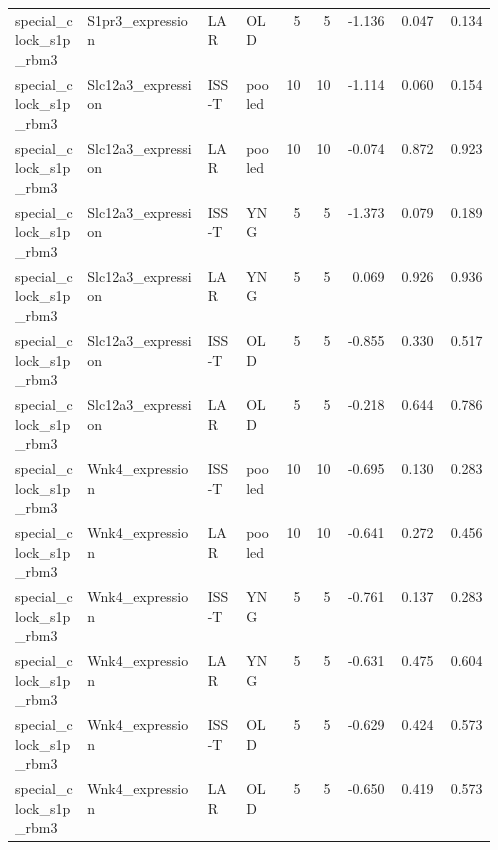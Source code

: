 \documentclass[11pt]{article}
\begin{document}
\begin{landscape}
\begin{longtable}{p{0.15\linewidth}p{0.25\linewidth}p{0.08\linewidth}p{0.08\linewidth}rrrrr}
special\_clock\_s1p\_rbm3 & S1pr3\_expression & LAR & OLD & 5 & 5 & -1.136 & 0.047 & 0.134 \\
special\_clock\_s1p\_rbm3 & Slc12a3\_expression & ISS-T & pooled & 10 & 10 & -1.114 & 0.060 & 0.154 \\
special\_clock\_s1p\_rbm3 & Slc12a3\_expression & LAR & pooled & 10 & 10 & -0.074 & 0.872 & 0.923 \\
special\_clock\_s1p\_rbm3 & Slc12a3\_expression & ISS-T & YNG & 5 & 5 & -1.373 & 0.079 & 0.189 \\
special\_clock\_s1p\_rbm3 & Slc12a3\_expression & LAR & YNG & 5 & 5 & 0.069 & 0.926 & 0.936 \\
special\_clock\_s1p\_rbm3 & Slc12a3\_expression & ISS-T & OLD & 5 & 5 & -0.855 & 0.330 & 0.517 \\
special\_clock\_s1p\_rbm3 & Slc12a3\_expression & LAR & OLD & 5 & 5 & -0.218 & 0.644 & 0.786 \\
special\_clock\_s1p\_rbm3 & Wnk4\_expression & ISS-T & pooled & 10 & 10 & -0.695 & 0.130 & 0.283 \\
special\_clock\_s1p\_rbm3 & Wnk4\_expression & LAR & pooled & 10 & 10 & -0.641 & 0.272 & 0.456 \\
special\_clock\_s1p\_rbm3 & Wnk4\_expression & ISS-T & YNG & 5 & 5 & -0.761 & 0.137 & 0.283 \\
special\_clock\_s1p\_rbm3 & Wnk4\_expression & LAR & YNG & 5 & 5 & -0.631 & 0.475 & 0.604 \\
special\_clock\_s1p\_rbm3 & Wnk4\_expression & ISS-T & OLD & 5 & 5 & -0.629 & 0.424 & 0.573 \\
special\_clock\_s1p\_rbm3 & Wnk4\_expression & LAR & OLD & 5 & 5 & -0.650 & 0.419 & 0.573 \\
\bottomrule
\end{longtable}
\normalsize
\end{landscape}
\end{document}
